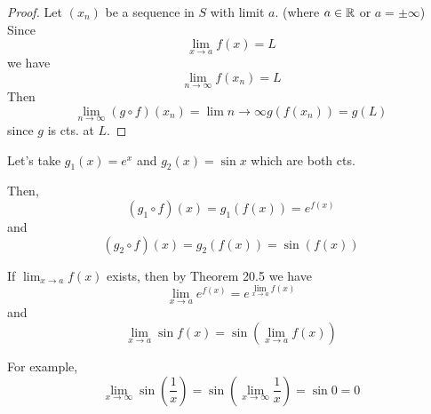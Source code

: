 \documentclass{article}
\begin{document}
\begin{proof}
    Let $(x_n)$ be a sequence in $S$ with limit $a$. (where $a \in \mathbb{R}$ or $a = \pm \infty$)
    Since \[
    \lim_{x\to a}f(x) = L
    \]
    we have \[
    \lim_{n\to\infty}f(x_n) = L
    \]
    Then \[
    \lim_{n\to\infty}(g \circ f)(x_n) = \lim{n\to\infty} g(f(x_n)) = g(L)
    \]
    since $g$ is cts. at $L$.
\end{proof}
\begin{example}
Let's take $g_1(x) = e^x$ and $g_2(x) = \sin x$ which are both cts.

Then, \[
(g_1 \circ f)(x) = g_1(f(x)) = e^{f(x)}
\]
and \[
(g_2 \circ f)(x) = g_2(f(x)) = \sin (f(x))
\]

If $\lim_{x\to a}f(x)$ exists, then by Theorem 20.5 we have
\[
\lim_{x\to a} e^{f(x)}= e^{\lim_{x\to a} f(x)}
\]
and \[
\lim_{x\to a} \sin f(x) = \sin \left(\lim_{x\to a} f(x) \right)
\]

For example, \[
    \lim_{x\to\infty} \sin \left( \frac{1}{x}\right) = \sin \left( \lim_{x\to\infty} \frac{1}{x}\right) = \sin 0 = 0
\]
\end{example}
\end{document}

